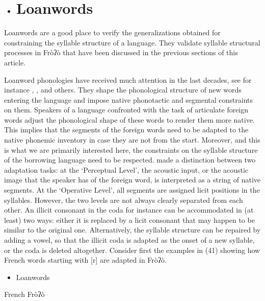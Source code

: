\begin{itemize}
\item \section{ Loanwords}\end{itemize}

 Loanwords are a good place to verify the generalizations obtained for constraining the syllable structure of a language. They validate syllable structural processes in Fròʔò that have been discussed in the previous sections of this article.

Loanword phonologies have received much attention in the last decades, see for instance \citet{ItoMester1995}, \citet{Silverman1992}, \citet{PeperkampDupoux2003} and others. They shape the phonological structure of new words entering the language and impose native phonotactic and segmental constraints on them. Speakers of a language confronted with the task of articulate foreign words adjust the phonological shape of these words to render them more native. This implies that the segments of the foreign words need to be adapted to the native phonemic inventory in case they are not from the start. Moreover, and this is what we are primarily interested here, the constraints on the syllable structure of the borrowing language need to be respected. \citet{Silverman1992} made a distinction between two adaptation tasks: at the ‘Perceptual Level’, the acoustic input, or the acoustic image that the speaker has of the foreign word, is interpreted as a string of native segments. At the ‘Operative Level’, all segments are assigned licit positions in the syllables. However, the two levels are not always clearly separated from each other. An illicit consonant in the coda for instance can be accommodated in (at least) two ways: either it is replaced by a licit consonant that may happen to be similar to the original one. Alternatively, the syllable structure can be repaired by adding a vowel, so that the illicit coda is adapted as the onset of a new syllable, or the coda is deleted altogether. Consider first the examples in (41) showing how French words starting with [r] are adapted in Fròʔò.

\begin{itemize}
\item \begin{styleindexi}
   \label{bkm:Ref476049186}Loanwords 
\end{styleindexi}\end{itemize}
\begin{styleindexi}
            French                                       Fròʔò                 
\end{styleindexi}


